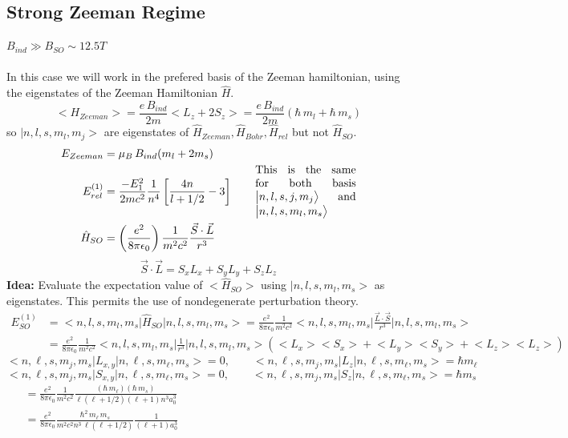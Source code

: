 \documentclass[12pt,fancychapters]{report}
\numberwithin{equation}{section}
\begin{document}
\subsection{Strong Zeeman Regime}
$B_{ind}\gg B_{SO}\sim 12.5T$\\
\\
In this case we will work in the prefered basis of the Zeeman hamiltonian, using the eigenstates
of the Zeeman Hamiltonian $\hat{H}$.
\[
  \big<H_{Zeeman}\big> = \frac{e\,B_{ind}}{2m}\Big<L_z + 2S_z\Big> = \frac{e\,B_{ind}}{2m}
  \left(\hbar\,m_l + \hbar\,m_s \right)
\]
so $\big|n, l, s, m_l, m_j \big>$ are eigenstates of $\hat{H}_{Zeeman}, \hat{H}_{Bohr}, \hat{H}_
{rel}$ but not $\hat{H}_{SO}$.
\begin{align*}
  E_{Zeeman} &= \mu_B\,B_{ind}(m_l + 2m_s)\\
  E_{rel}^{(1)} &= \frac{-E_1^2}{2mc^2}\frac{1}{n^4}\left[\frac{4n}{l+1/2} - 3\right]\qquad\parbox
  {0.26\textwidth}{This is the same for both basis $\big|n, l, s, j, m_j\big>$ and $\big|n, l, 
  s, m_l, m_s\big>$}\\
  \hat{H}_{SO} &= \left(\frac{e^2}{8\pi\epsilon_0}\right)\frac{1}{m^2 c^2}\frac{\vec{S}\cdot
  \vec{L}}{r^3}
\end{align*}
\[
  \vec{S}\cdot\vec{L} = S_xL_x + S_yL_y + S_zL_z 
\]
\textbf{Idea:} Evaluate the expectation value of $\big<\hat{H}_{SO}\big>$ using $\big|n, l, s, 
m_l, m_s\big>$ as eigenstates. This permits the use of nondegenerate perturbation theory. 
\begin{align*}
  E_{SO}^{(1)} &=\big<n, l, s, m_l, m_s\big|\hat{H}_{SO}\big|n, l, s, m_l, m_s\big> = 
  \frac{e^2}{8\pi\epsilon_0}\frac{1}{m^2c^2}\Big<n, l, s, m_l, m_s\Big|\frac{\vec{L}\cdot
  \vec{S}}{r^3}\Big|n, l, s, m_l, m_s\Big>\\
               &= \frac{e^2}{8\pi\epsilon_0}\frac{1}{m^2c^2}\Big<n, l, s, m_l, m_s
               \Big|\frac{1}{r^3}\Big|n, l, s, m_l, m_s\Big>\left(\big<L_x\big>\big<S_x\big>
               + \big<L_y\big>\big<S_y\big>+\big<L_z\big>\big<L_z\big>\right) 
\end{align*}
\[
  \big<n, \ell, s, m_j, m_s\big|L_{x,y}\big|n, \ell, s, m_\ell, m_s\big> = 0, \qquad
  \big<n, \ell, s, m_j, m_s\big|L_z\big|n, \ell, s, m_\ell, m_s\big> = \hbar m_\ell
\]
\[
  \big<n, \ell, s, m_j, m_s\big|S_{x,y}\big|n, \ell, s, m_\ell, m_s\big> = 0, \qquad
  \big<n, \ell, s, m_j, m_s\big|S_z\big|n, \ell, s, m_\ell, m_s\big> = \hbar m_s
\]
\begin{align*}
&= \frac{e^2}{8\pi\epsilon_0}\frac{1}{m^2c^2}\frac{(\hbar\,m_\ell)(\hbar\,m_s)}{\ell(\ell+1/2)
(\ell+1)n^3a_0^3}\qquad \qquad \qquad \qquad \qquad \qquad \qquad\qquad\qquad\qquad\\
&= \frac{e^2}{8\pi\epsilon_0}\frac{\hbar^2\,m_\ell\,m_s}{m^2c^2n^3\,\ell(\ell+1/2)}
\frac{1}{(\ell+1)a_0^3}
\end{align*}
\end{document}
